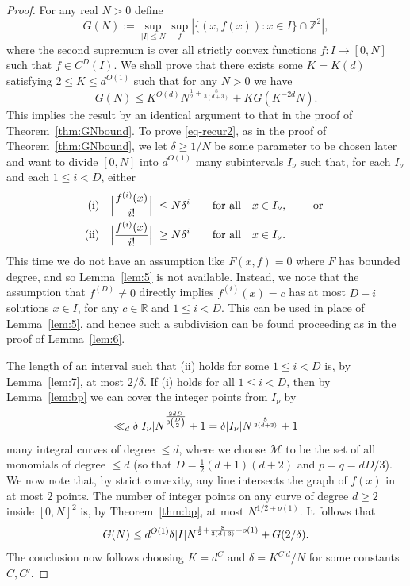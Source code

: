 \documentclass[12pt]{amsart}
\newcommand{\Z}{{\mathbb Z}}
\newcommand{\1}{{\mathbf 1}}
\theoremstyle{remark}
\theoremstyle{definition}
\begin{document}
\begin{proof}
For any real $N>0$ define
\[
G(N):= \sup_{|I|\le N} \sup_{f}\left\lvert \big\{(x,f(x)) : x \in I \big\}\cap \Z^2 \right\rvert,\]
where the second supremum is over all strictly convex functions $f:I\to [0,N]$ such that $f\in C^D(I)$. We shall prove that there exists some $K=K(d)$ satisfying $2\leq K\leq d^{O(1)}$ such that for any $N>0$ we have
\begin{equation}\label{eq-recur2}
G(N) \leq K^{O(d)} N^{\frac{1}{2}+\frac{8}{3(d+3)}} + KG(K^{-2d}N).
\end{equation}
This implies the result by an identical argument to that in the proof of Theorem~\ref{thm:GNbound}. To prove \eqref{eq-recur2}, as in the proof of Theorem~\ref{thm:GNbound}, we let $\delta\geq 1/N$ be some parameter to be chosen later and want to divide $[0,N]$ into $d^{O(1)}$ many subintervals $I_\nu$ such that, for each $I_\nu$ and each $1\leq i<D$, either 
\begin{align*}
{\rm (i)} & &\Big|\frac{f^{(i)}(x)}{i!}\Big| \ &\le N\delta^i \qquad {\rm for \ all }\quad x\in I_\nu, \qquad\textrm{ or }\\
{\rm (ii)} & &\Big|\frac{f^{(i)}(x)}{i!}\Big| \ &\ge N\delta^i  \qquad {\rm for \ all }\quad x\in I_\nu.
\end{align*}
This time we do not have an assumption like $F(x,f)=0$ where $F$ has bounded degree, and so Lemma~\ref{lem:5} is not available. Instead, we note that the assumption that $f^{(D)}\neq 0$ directly implies $f^{(i)}(x)=c$ has at most $D-i$ solutions $x\in I$, for any $c\in \mathbb{R}$ and $1\leq i<D$. This can be used in place of Lemma~\ref{lem:5}, and hence such a subdivision can be found proceeding as in the proof of Lemma~\ref{lem:6}.

The length of an interval such that (ii) holds for some $1\leq i<D$ is, by Lemma~\ref{lem:7}, at most $2/\delta$. If (i) holds for all $1\leq i<D$, then by Lemma~\ref{lem:bp} we can cover the integer points from $I_\nu$ by 
\[\ll_d \delta \abs{I_\nu}N^{\frac{2dD}{3\binom{D}{2}}}+1=\delta \abs{I_\nu}N^{\frac{8}{3(d+3)}}+1\]
many integral curves of degree $\leq d$, where we choose $\mathcal{M}$ to be the set of all monomials of degree $\leq d$ (so that $D=\frac{1}{2}(d+1)(d+2)$ and $p=q=dD/3$). We now note that, by strict convexity, any line intersects the graph of $f(x)$ in at most 2 points. The number of integer points on any curve of degree $d\geq 2$ inside $[0,N]^2$ is, by Theorem~\ref{thm:bp}, at most $N^{1/2+o(1)}$. It follows that
\[G(N) \leq d^{O(1)}\delta \abs{I}N^{\frac{1}{2}+\frac{8}{3(d+3)}+o(1)}+G(2/\delta).\]
The conclusion now follows choosing $K=d^C$ and $\delta=K^{C'd}/N$ for some constants $C,C'$. 
\end{proof}
\end{document}
